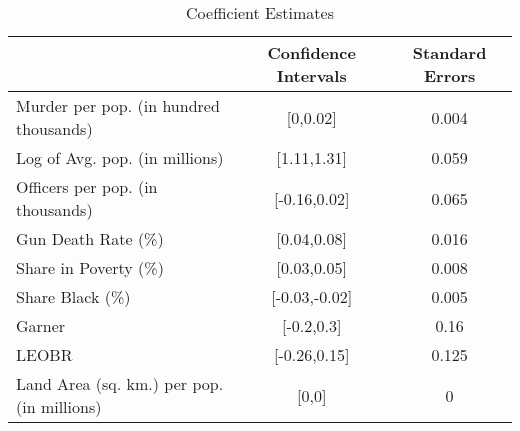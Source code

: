 \begin{table}[ht]
\centering
\caption{Coefficient Estimates} \label{table:bootstrap_coefficients}
\begin{tabular}{lcc}
\hline \hline
& Confidence Intervals & Standard Errors \\ 
\hline
Murder per pop. (in hundred thousands) &[0,0.02]&0.004\\
Log of Avg. pop. (in millions) &[1.11,1.31]&0.059\\
Officers per pop. (in thousands) &[-0.16,0.02]&0.065\\
Gun Death Rate (\%) &[0.04,0.08]&0.016\\
Share in Poverty (\%) &[0.03,0.05]&0.008\\
Share Black (\%) &[-0.03,-0.02]&0.005\\
Garner &[-0.2,0.3]&0.16\\
LEOBR &[-0.26,0.15]&0.125\\
Land Area (sq. km.) per pop. (in millions) &[0,0]&0\\
\hline \end{tabular} \end{table}